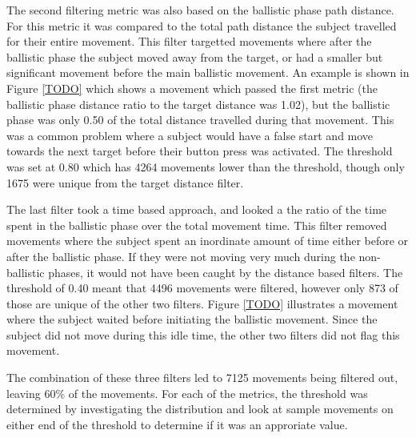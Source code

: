 The second filtering metric was also based on the ballistic phase path distance.
For this metric it was compared to the total path distance the subject travelled for their entire movement.
This filter targetted movements where after the ballistic phase the subject moved away from the target, or had a smaller but significant movement before the main ballistic movement.
An example is shown in Figure \ref{TODO} which shows a movement which passed the first metric (the ballistic phase distance ratio to the target distance was 1.02), but the ballistic phase was only 0.50 of the total distance travelled during that movement.
This was a common problem where a subject would have a false start and move towards the next target before their button press was activated.
The threshold was set at 0.80 which has 4264 movements lower than the threshold, though only 1675 were unique from the target distance filter.

The last filter took a time based approach, and looked a the ratio of the time spent in the ballistic phase over the total movement time.
This filter removed movements where the subject spent an inordinate amount of time either before or after the ballistic phase.
If they were not moving very much during the non-ballistic phases, it would not have been caught by the distance based filters.
The threshold of 0.40 meant that 4496 movements were filtered, however only 873 of those are unique of the other two filters.
Figure \ref{TODO} illustrates a movement where the subject waited before initiating the ballistic movement.
Since the subject did not move during this idle time, the other two filters did not flag this movement.

The combination of these three filters led to 7125 movements being filtered out, leaving 60\% of the movements.
For each of the metrics, the threshold was determined by investigating the distribution and look at sample movements on either end of the threshold to determine if it was an approriate value.

